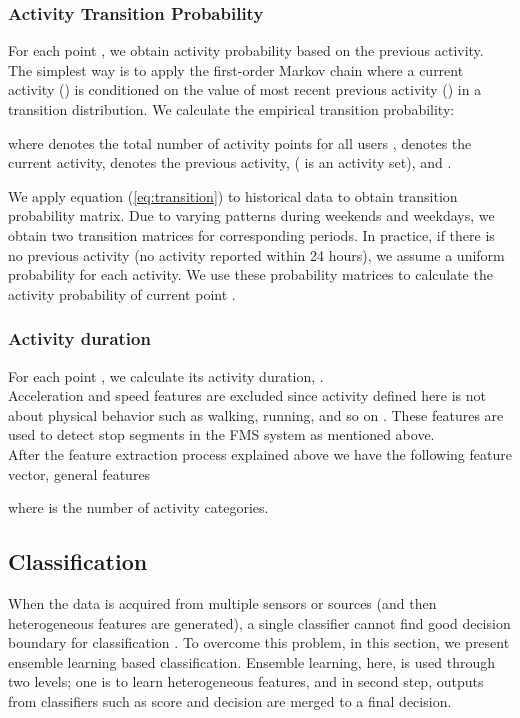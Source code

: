 \documentclass{sig-alternate}
\begin{document}
\subsubsection{Activity Transition Probability} For each point , we obtain activity probability based on the previous activity. The simplest way is to apply the first-order Markov chain where a current activity () is conditioned on the value of most recent previous activity () in a transition distribution. We calculate the empirical transition probability:



where  denotes the total number of activity points for all users ,  denotes the current activity,  denotes the previous activity,  ( is an activity set), and  .

\noindent  We apply equation (\ref{eq:transition}) to historical data to obtain transition probability matrix. Due to varying patterns during weekends and weekdays, we obtain two transition matrices for corresponding periods. In practice, if there is no previous activity (no activity reported within 24 hours), we assume a uniform probability for each activity. We use these probability matrices to calculate the activity probability of current point .



\subsubsection{Activity duration} For each point , we calculate its activity duration, . \\



Acceleration and speed features are excluded since activity defined here is not about physical behavior such as walking, running, and so on \cite{Kwapisz2011ActivityAccelerometers}. These features are used to detect stop segments in the FMS system as mentioned above. \\


After the feature extraction process explained above we have the following feature vector, general features

 where  is the number of activity categories.\par


\subsection{Classification}
 When the data is acquired from multiple sensors or sources (and then heterogeneous features are generated), a single classifier cannot find good decision boundary for classification \cite{Polikar2006Ensemble}. To overcome this problem, in this section, we present ensemble learning based classification. Ensemble learning, here, is used through two levels; one is to learn heterogeneous features, and in second step, outputs from classifiers such as score and decision are merged to a final decision.
\end{document}
